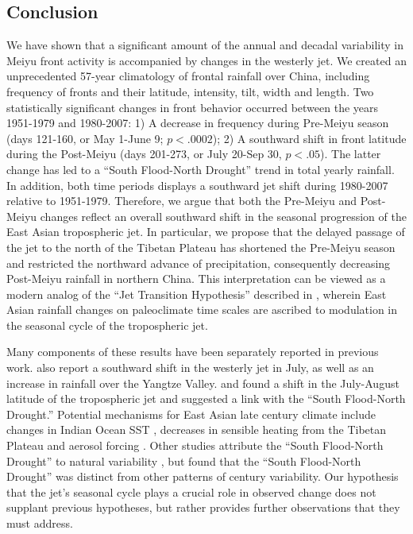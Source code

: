 \documentclass[draft,grl]{AGUTeX}
\begin{document}
\begin{article}
\section{Conclusion}

	{\color{blue} We have shown that a significant amount of the annual and decadal variability in Meiyu front activity is accompanied by changes in the westerly jet. } We  created an unprecedented 57-year climatology of frontal rainfall over China, including frequency of fronts and their latitude, intensity, tilt, width and length. Two statistically significant changes in front behavior occurred between the years 1951-1979 and 1980-2007: 1) A decrease in frequency during Pre-Meiyu season (days 121-160, or May 1-June 9; $p < .0002$); 2) A southward shift in front latitude during the Post-Meiyu (days 201-273, or July 20-Sep 30, $p<.05$). The latter change has led to a ``South Flood-North Drought'' trend in total yearly rainfall. In addition, both time periods displays a southward jet shift during 1980-2007 relative to 1951-1979. Therefore, we argue that both the Pre-Meiyu and Post-Meiyu changes reflect an overall southward shift in the seasonal progression of the East Asian tropospheric jet.
{\color{blue}  In particular, we propose that the delayed passage of the jet to the north of the Tibetan Plateau has shortened the Pre-Meiyu season  and restricted the northward advance of precipitation, consequently decreasing Post-Meiyu rainfall in northern China. } 
This interpretation can be viewed as a modern analog of the ``Jet Transition Hypothesis'' described in \citet{Chiang2015}, wherein East Asian rainfall changes on paleoclimate time scales are ascribed to modulation in the seasonal cycle of the tropospheric jet. 	

 
	Many components of these results have been separately reported in previous work. \citet{Xuan2011} also report a southward shift in the westerly jet in July, as well as an increase in rainfall over the Yangtze Valley. \citet{Yu2004} and \citet{Yu2007} found a shift in the July-August latitude of the tropospheric jet and suggested a link with the ``South Flood-North Drought.'' Potential mechanisms for East Asian late  century climate include changes in Indian Ocean SST \citep{Qu2012}, decreases in sensible heating from the Tibetan Plateau \citep{Liu2012a,Hu2015} and aerosol forcing \citep{Song2014}. Other studies attribute the ``South Flood-North Drought'' to natural variability \citep{Zhang1999,Xin2006,Lei2014}, but \citet{Zhou2009} found that the ``South Flood-North Drought'' was distinct from other patterns of  century variability. Our hypothesis that the jet's seasonal cycle plays a crucial role in observed change does not supplant previous hypotheses, but rather provides further observations that they must address.
	

\end{article}
\end{document}
